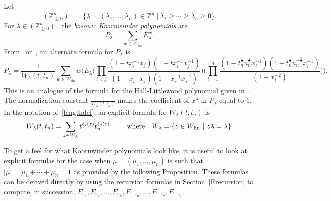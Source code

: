 \documentclass[11pt]{article}
\theoremstyle{plain}
\theoremstyle{definition}
\theoremstyle{remark}
\numberwithin{equation}{section}
\def\ZZ{\mathbb{Z}}
\newcounter{r}
\newcounter{s}
\begin{document}
Let
$$(\ZZ_{\ge0}^n)^+ = \{
\lambda=(\lambda_1, \ldots, \lambda_n)\in \ZZ^n \ |\ \lambda_1\ge \cdots \ge \lambda_n\ge 0\}.
$$
For $\lambda\in (\ZZ^n_{\ge0})^+$
the \emph{bosonic Koornwinder polynomials} are 
\begin{equation}
P_\lambda
= \sum_{w\in W_{\mathrm{fin}}} E^w_\lambda.
\label{bosMac}
\end{equation}
From~\cite[(53) and the first formula in Proposition 3.2]{CR24} or~\cite[(5.5.14) and \S5.7]{Mac03}, an alternate formula for $P_\lambda$ is  
\begin{equation*}
P_\lambda = 
\frac{1}{W_\lambda(t,t_n)} 
\sum_{w\in W_{\mathrm{fin}}} 
w\Big(E_\lambda  \Big(\prod_{i<j} \frac{(1-tx_i^{-1}x_j)(1-tx_i^{-1}x_j^{-1})}{(1-x_i^{-1}x_j)(1-x_i^{-1}x_j^{-1})}\Big)
\Big(\prod_{i=1}^n \frac{(1-t_n^{\frac12}u_n^{\frac12}x_i^{-1})(1+t_n^{\frac12}u_n^{-\frac12} x_i^{-1})}{(1-x_i^{-2})}\Big)\Big).
\end{equation*}
This is an analogue of the formula for the Hall-Littlewood polynomial given in~\cite[(2.1)]{Mac}.  
The normalization constant $\frac{1}{W_\lambda(t,t_n)}$ makes the coefficient of $x^\lambda$ in $P_\lambda$ equal to $1$.
In the notation of~\eqref{lengthdef}, an explicit formula for $W_\lambda(t,t_n)$ is 
\begin{equation}
W_\lambda(t,t_n) = \sum_{z\in W_\lambda} t^{\ell_s(z)}t_n^{\ell_d(z)},
\qquad\hbox{where}\quad
W_\lambda = \{ z\in W_{\mathrm{fin}}\ |\ z \lambda = \lambda\}.
\label{Ppoly}
\end{equation}


To get a feel for what Koornwinder polynomials look like, it is useful to look at explicit formulas for the
case when $\mu= (\mu_1, \ldots, \mu_n)$ is such that $\vert \mu\vert = \mu_1+\cdots+\mu_n = 1$ as provided by the following
Proposition.  These formulas can be derived directly
by using the recursion formulas in Section~\ref{Erecursion} to compute, 
in succession, $E_{\varepsilon_1}, E_{\varepsilon_2},
\ldots, E_{\varepsilon_n}, E_{-\varepsilon_n}, \ldots, E_{-\varepsilon_2}, E_{-\varepsilon_1}$.
\end{document}
